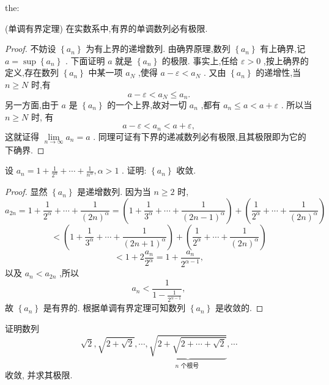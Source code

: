 \begin{theorem}{}{the:}

\end{theorem}
(单调有界定理) 在实数系中,有界的单调数列必有极限.

\begin{proof}
不妨设 \(\left\{  {a}_{n}\right\}\) 为有上界的递增数列. 由确界原理,数列 \(\left\{  {a}_{n}\right\}\) 有上确界,记 \(a = \sup \left\{  {a}_{n}\right\}\) . 下面证明 \(a\) 就是 \(\left\{  {a}_{n}\right\}\) 的极限. 事实上,任给 \(\varepsilon  > 0\) ,按上确界的定义,存在数列 \(\left\{  {a}_{n}\right\}\) 中某一项 \({a}_{N}\) ,使得 \(a - \varepsilon  < {a}_{N}\) . 又由 \(\left\{  {a}_{n}\right\}\) 的递增性,当 \(n \geq  N\) 时,有
\[
a - \varepsilon  < {a}_{N} \leq  {a}_{n}.
\]
另一方面,由于 \(a\) 是 \(\left\{  {a}_{n}\right\}\) 的一个上界,故对一切 \({a}_{n}\) ,都有 \({a}_{n} \leq  a < a + \varepsilon\) . 所以当 \(n \geq  N\) 时, 有
\[
a - \varepsilon  < {a}_{n} < a + \varepsilon ,
\]
这就证得 \(\mathop{\lim }\limits_{{n \rightarrow  \infty }}{a}_{n} = a\) . 同理可证有下界的递减数列必有极限,且其极限即为它的下确界.
\end{proof}


\begin{example}
设 \({a}_{n} = 1 + \frac{1}{{2}^{\alpha }} + \cdots  + \frac{1}{{n}^{\alpha }},\alpha  > 1\) . 证明: \(\left\{  {a}_{n}\right\}\) 收敛.
\end{example}


\begin{proof}
显然 \(\left\{  {a}_{n}\right\}\) 是递增数列. 因为当 \(n \geq  2\) 时,
\[
{a}_{2n} = 1 + \frac{1}{{2}^{\alpha }} + \cdots  + \frac{1}{{\left( 2n\right) }^{\alpha }} = \left( {1 + \frac{1}{{3}^{\alpha }} + \cdots  + \frac{1}{{\left( 2n - 1\right) }^{\alpha }}}\right)  + \left( {\frac{1}{{2}^{\alpha }} + \cdots  + \frac{1}{{\left( 2n\right) }^{\alpha }}}\right)
\]
\[
< \left( {1 + \frac{1}{{3}^{\alpha }} + \cdots  + \frac{1}{{\left( 2n + 1\right) }^{\alpha }}}\right)  + \left( {\frac{1}{{2}^{\alpha }} + \cdots  + \frac{1}{{\left( 2n\right) }^{\alpha }}}\right)
\]
\[
< 1 + 2\frac{{a}_{n}}{{2}^{\alpha }} = 1 + \frac{{a}_{n}}{{2}^{\alpha  - 1}},
\]
以及 \({a}_{n} < {a}_{2n}\) ,所以
\[
{a}_{n} < \frac{1}{1 - \frac{1}{{2}^{\alpha  - 1}}},
\]
故 \(\left\{  {a}_{n}\right\}\) 是有界的. 根据单调有界定理可知数列 \(\left\{  {a}_{n}\right\}\) 是收敛的.
\end{proof}


\begin{example}
证明数列
\[
\sqrt{2},\sqrt{2 + \sqrt{2}},\cdots ,\underset{n\text{ 个根号 }}{\underbrace{\sqrt{2 + \sqrt{2 + \cdots  + \sqrt{2}}}}},\cdots
\]
收敛, 并求其极限.
\end{example}


